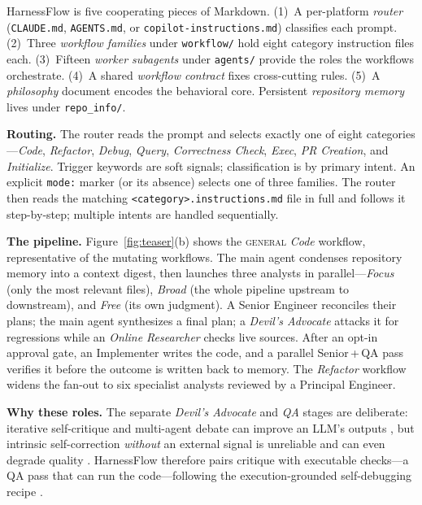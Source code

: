 \documentclass{article}
\begin{document}
HarnessFlow is five cooperating pieces of Markdown. (1)~A per-platform
\emph{router} (\texttt{CLAUDE.md}, \texttt{AGENTS.md}, or
\texttt{copilot-instructions.md}) classifies each prompt. (2)~Three
\emph{workflow families} under \texttt{workflow/} hold eight category instruction
files each. (3)~Fifteen \emph{worker subagents} under \texttt{agents/} provide the
roles the workflows orchestrate. (4)~A shared \emph{workflow contract} fixes
cross-cutting rules. (5)~A \emph{philosophy} document encodes the behavioral core.
Persistent \emph{repository memory} lives under \texttt{repo\_info/}.

\textbf{Routing.} The router reads the prompt and selects exactly one of eight
categories---\emph{Code}, \emph{Refactor}, \emph{Debug}, \emph{Query},
\emph{Correctness Check}, \emph{Exec}, \emph{PR Creation}, and \emph{Initialize}.
Trigger keywords are soft signals; classification is by primary intent. An
explicit \texttt{mode:} marker (or its absence) selects one of three families.
The router then reads the matching \texttt{<category>.instructions.md} file in
full and follows it step-by-step; multiple intents are handled sequentially.

\textbf{The pipeline.} Figure~\ref{fig:teaser}(b) shows the \textsc{general}
\emph{Code} workflow, representative of the mutating workflows. The main agent
condenses repository memory into a context digest, then launches three analysts
in parallel---\emph{Focus} (only the most relevant files), \emph{Broad} (the
whole pipeline upstream to downstream), and \emph{Free} (its own judgment). A
Senior Engineer reconciles their plans; the main agent synthesizes a final plan;
a \emph{Devil's Advocate} attacks it for regressions while an \emph{Online
Researcher} checks live sources. After an opt-in approval gate, an Implementer
writes the code, and a parallel Senior\,+\,QA pass verifies it before the outcome
is written back to memory. The \emph{Refactor} workflow widens the fan-out to six
specialist analysts reviewed by a Principal Engineer.

\textbf{Why these roles.} The separate \emph{Devil's Advocate} and \emph{QA}
stages are deliberate: iterative self-critique and multi-agent debate can improve
an LLM's outputs \citep{madaan2023selfrefine,shinn2023reflexion,du2023debate},
but intrinsic self-correction \emph{without} an external signal is unreliable and
can even degrade quality \citep{huang2024selfcorrect,olausson2024selfrepair}.
HarnessFlow therefore pairs critique with executable checks---a QA pass that can
run the code---following the execution-grounded self-debugging recipe
\citep{chen2023selfdebug}.
\end{document}
